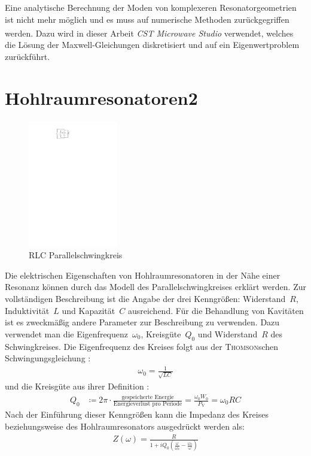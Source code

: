 Eine analytische Berechnung der Moden von komplexeren Resonatorgeometrien ist nicht mehr möglich und es muss auf numerische Methoden zurückgegriffen werden.
Dazu wird in dieser Arbeit \emph{CST Microwave Studio\textsuperscript{\textregistered}} verwendet, welches die Lösung der Maxwell-Gleichungen diskretisiert und auf ein Eigenwertproblem zurückführt.
\section{Hohlraumresonatoren2}
\begin{figure}[h]
  \centering
  \includegraphics[width=0.35\textwidth]{./figs/RLC_circuit.pdf}
  \caption{RLC Parallelschwingkreis}
  \label{fig:rlc_circuit}
\end{figure}
Die elektrischen Eigenschaften von Hohlraumresonatoren in der Nähe einer Resonanz können durch das Modell des Parallelschwingkreises erklärt werden.
Zur vollständigen Beschreibung ist die Angabe der drei Kenngrößen: Widerstand~$R$, Induktivität~$L$ und Kapazität~$C$ ausreichend.
Für die Behandlung von Kavitäten ist es zweckmäßig andere Parameter zur Beschreibung zu verwenden.
Dazu verwendet man die Eigenfrequenz~$\omega_0$, Kreisgüte~$Q_0$ und Widerstand~$R$ des Schwingkreises.
Die Eigenfrequenz des Kreises folgt aus der \textsc{Thomson}schen Schwingungsgleichung :
\begin{align}
  \omega_0 = \frac{1}{\sqrt{L C}}
\end{align}
und die Kreisgüte aus ihrer Definition :
\begin{align}
  Q_0 &\coloneqq 2\pi \cdot \frac{\text{gespeicherte Energie}}{\text{Energieverlust pro Periode}} = \frac{\omega_0 W_0}{P_\mathrm{V}} = \omega_0 R C
  \label{eq:def_guete}
\end{align}
Nach der Einführung dieser Kenngrößen kann die Impedanz des Kreises beziehungsweise des Hohlraumresonators ausgedrückt werden als:
\begin{align}
  Z(\omega) = \frac{R}{1 + i Q_0 \left( \frac{\omega}{\omega_0}  - \frac{\omega_0}{\omega}\right)}
\end{align}

